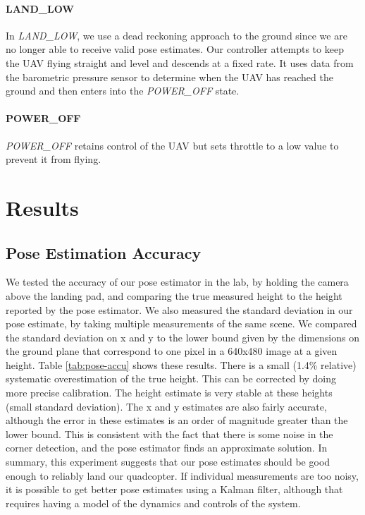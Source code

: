 \documentclass[10pt]{scrartcl} %
\begin{document}
\paragraph{LAND\_LOW}
In \textit{LAND\_LOW}, we use a dead reckoning approach to the ground since we
are no longer able to receive valid pose estimates. Our controller attempts to
keep the UAV flying straight and level and descends at a fixed rate. It uses
data from the barometric pressure sensor to determine when the UAV has reached
the ground and then enters into the \textit{POWER\_OFF} state.

\paragraph{POWER\_OFF}
\textit{POWER\_OFF} retains control of the UAV but sets throttle to a low value
to prevent it from flying.

\section{Results}

\subsection{Pose Estimation Accuracy}
\label{sec:accuracy}

We tested the accuracy of our pose estimator in the lab, by holding the camera
above the landing pad, and comparing the true measured height to the height
reported by the pose estimator. We also measured the standard deviation in our
pose estimate, by taking multiple measurements of the same scene. We compared
the standard deviation on x and y to the lower bound given by the dimensions on
the ground plane that correspond to one pixel in a 640x480 image at a given
height. Table \ref{tab:pose-accu} shows these results. There is a small (1.4\%
relative) systematic overestimation of the true height. This can be corrected
by doing more precise calibration. The height estimate is very stable at these
heights (small standard deviation). The x and y estimates are also fairly
accurate, although the error in these estimates is an order of magnitude
greater than the lower bound. This is consistent with the fact that there is
some noise in the corner detection, and the pose estimator finds an approximate
solution. In summary, this experiment suggests that our pose estimates should
be good enough to reliably land our quadcopter. If individual measurements are
too noisy, it is possible to get better pose estimates using a Kalman filter,
although that requires having a model of the dynamics and controls of the
system.
\end{document}
